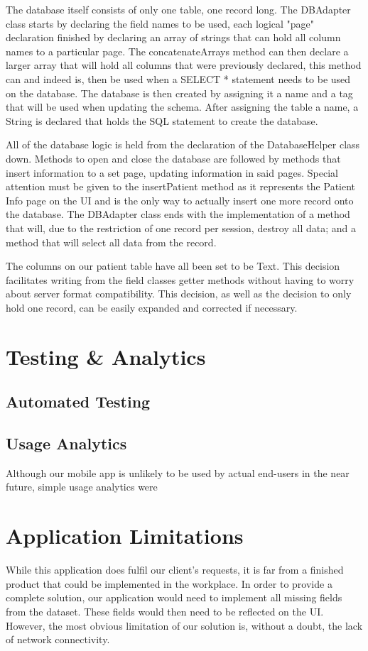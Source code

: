 \documentclass[12pt,a4paper,oneside,titlepage]{article}
\begin{document}
The database itself consists of only one table, one record long. The DBAdapter class starts by declaring the field names to be used, each logical "page" declaration finished by declaring an array of strings that can hold all column names to a particular page. The concatenateArrays method can then declare a larger array that will hold all columns that were previously declared, this method can and indeed is, then be used when a SELECT * statement needs to be used on the database. The database is then created by assigning it a name and a tag that will be used when updating the schema. After assigning the table a name, a String is declared that holds the SQL statement to create the database.

All of the database logic is held from the declaration of the DatabaseHelper class down. Methods to open and close the database are followed by methods that insert information to a set page, updating information in said pages. Special attention must be given to the insertPatient method as it represents the Patient Info page on the UI and is the only way to actually insert one more record onto the database. The DBAdapter class ends with the implementation of a method that will, due to the restriction of one record per session, destroy all data; and a method that will select all data from the record.

The columns on our patient table have all been set to be Text. This decision facilitates writing from the field classes getter methods without having to worry about server format compatibility. This decision, as well as the decision to only hold one record, can be easily expanded and corrected if necessary.

\newpage
\section{Testing \& Analytics}
\subsection{Automated Testing}

\subsection{Usage Analytics}
Although our mobile app is unlikely to be used by actual end-users in the near future, simple usage analytics were 

\newpage
\section{Application Limitations}
While this application does fulfil our client's requests, it is far from a finished product that could be implemented in the workplace. In order to provide a complete solution, our application would need to implement all missing fields from the dataset. These fields would then need to be reflected on the UI. However, the most obvious limitation of our solution is, without a doubt, the lack of network connectivity.
\end{document}
